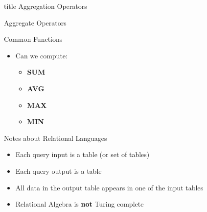\documentclass[aspectratio=169, xcolor=dvipsnames]{beamer}
\begin{document}
\begin{frame}
  \vfill
  \centering
  \begin{beamercolorbox}[sep=8pt,center,shadow=true,rounded=true]{title}
    Aggregation Operators\par%
  \end{beamercolorbox}
  \vfill
\end{frame}

\begin{frame}{Aggregate Operators}
    \begin{exampleblock}{Common Functions}
        \begin{itemize}[<+->]
            \item Can we compute:
            \begin{itemize}
                \item \textbf{SUM}
                \item \textbf{AVG}
                \item \textbf{MAX}
                \item \textbf{MIN}
            \end{itemize}
        \end{itemize}
    \end{exampleblock}
\end{frame}

\begin{frame}{Notes about Relational Languages}
    \begin{itemize}
        \item Each query input is a table (or set of tables)
        \item Each query output is a table
        \item All data in the output table appears in one of the input tables
        \item Relational Algebra is \textbf{not} Turing complete
    \end{itemize}
\end{frame}
\end{document}
